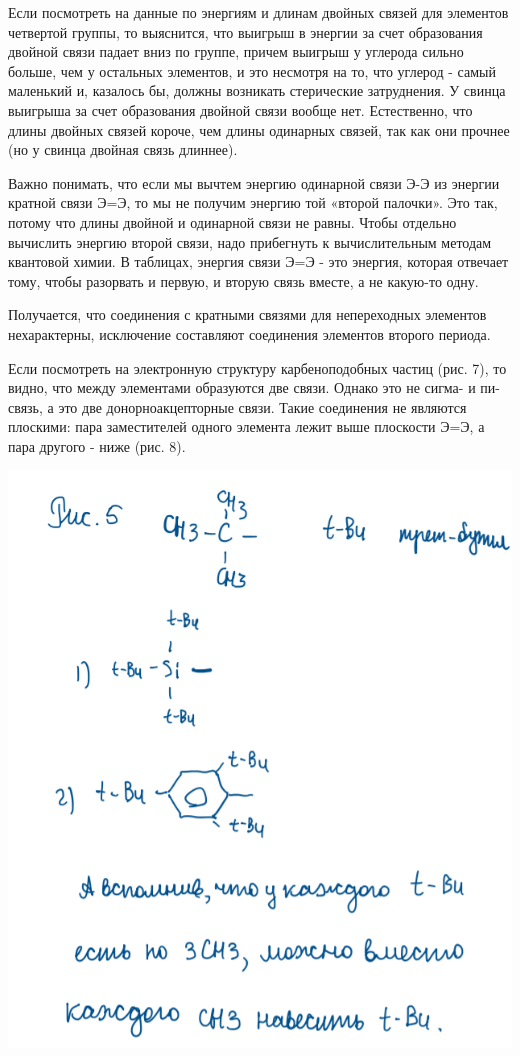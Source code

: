 \documentclass[14pt,a4paper]{scrartcl}
\begin{document}
Если посмотреть на данные по энергиям и длинам двойных связей для элементов четвертой группы, то выяснится, что выигрыш в энергии за счет образования двойной связи падает вниз по
группе, причем выигрыш у углерода сильно больше, чем у остальных элементов, и это несмотря на то, что углерод - самый маленький и, казалось бы, должны возникать стерические затруднения.
У свинца выигрыша за счет образования двойной связи вообще нет. Естественно, что длины двойных связей короче, чем длины одинарных связей, так как они прочнее (но у свинца двойная связь
длиннее).

Важно понимать, что если мы вычтем энергию одинарной связи Э-Э из энергии кратной связи Э=Э, то мы не получим энергию той «второй палочки». Это так, потому что длины двойной и
одинарной связи не равны. Чтобы отдельно вычислить энергию второй связи, надо прибегнуть к вычислительным методам квантовой химии. В таблицах, энергия связи Э=Э - это энергия, которая
отвечает тому, чтобы разорвать и первую, и вторую связь вместе, а не какую-то одну.

Получается, что соединения с кратными связями для непереходных элементов нехарактерны, исключение составляют соединения элементов второго периода. 

Если посмотреть на электронную структуру карбеноподобных частиц (рис. 7), то видно, что между элементами образуются две связи. Однако это не сигма- и пи-связь, а это две донорноакцепторные связи. Такие соединения не являются плоскими: пара заместителей одного элемента лежит выше плоскости Э=Э, а пара другого - ниже (рис. 8).

\includegraphics{14v2.png}
\end{document}
